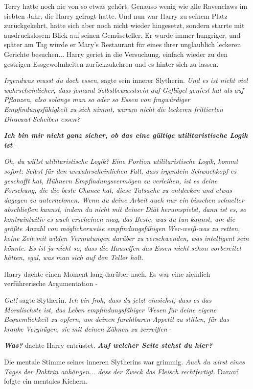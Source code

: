 Terry hatte noch nie von so etwas gehört. Genauso wenig wie alle Ravenclaws im
siebten Jahr, die Harry gefragt hatte. Und nun war Harry zu seinem Platz
zurückgekehrt, hatte sich aber noch nicht wieder hingesetzt, sondern starrte mit
ausdruckslosem Blick auf seinen Gemüseteller. Er wurde immer hungriger, und
später am Tag würde er Mary's Restaurant für eines ihrer unglaublich leckeren
Gerichte besuchen... Harry geriet in die Versuchung, einfach wieder zu den
gestrigen Essgewohnheiten zurückzukehren und es hinter sich zu lassen.

\emph{Irgendwas musst du doch essen, }sagte sein innerer Slytherin.
\emph{Und es ist nicht viel wahrscheinlicher, dass jemand Selbstbewusstsein auf Geflügel geniest hat als auf Pflanzen, also solange man so oder so Essen von fragwürdiger Empfindungsfähigkeit zu sich nimmt, warum nicht die leckeren frittierten Diracawl-Scheiben essen?}

\textbf{\emph{Ich bin mir nicht ganz sicher, ob das eine gültige
utilitaristische Logik ist}} -

\emph{Oh, du willst utilitaristische Logik? Eine Portion utilitaristische Logik, kommt sofort: Selbst für den unwahrscheinlichen Fall, dass irgendein Schwachkopf es geschafft hat, Hühnern Empfindungsvermögen zu verleihen, ist es deine Forschung, die die beste Chance hat, diese Tatsache zu entdecken und etwas dagegen zu unternehmen. Wenn du deine Arbeit auch nur ein bisschen schneller abschließen kannst, indem du nicht mit deiner Diät herumspielst, dann ist es, so kontraintuitiv es auch erscheinen mag, das Beste, was du tun kannst, um die größte Anzahl von möglicherweise empfindungsfähigen Wer-weiß-was zu retten, keine Zeit mit wilden Vermutungen darüber zu verschwenden, was intelligent sein könnte. Es ist ja nicht so, dass die Hauselfen das Essen nicht schon vorbereitet hätten, egal, was man sich auf den Teller holt.}

Harry dachte einen Moment lang darüber nach. Es war eine ziemlich verführerische
Argumentation -

\emph{Gut!} sagte Slytherin. \emph{Ich bin froh, dass du jetzt einsiehst, dass
es das Moralischste ist, das Leben empfindungsfähiger Wesen für deine eigene
Bequemlichkeit zu opfern, um deinen furchtbaren Appetit zu stillen, für das
kranke Vergnügen, sie mit deinen Zähnen zu zerreißen} -

\textbf{\emph{Was?}} dachte Harry entrüstet. \textbf{\emph{Auf welcher Seite
stehst du hier?}}

Die mentale Stimme seines inneren Slytherins war grimmig.
\emph{Auch du wirst eines Tages der Doktrin anhängen... dass der Zweck das Fleisch rechtfertigt.}
Darauf folgte ein mentales Kichern.

